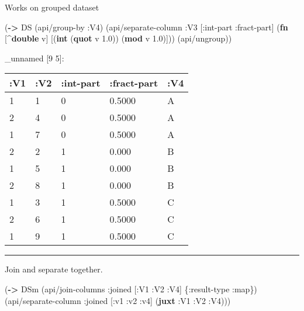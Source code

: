 \documentclass[]{article}
\newenvironment{Shaded}{\begin{snugshade}}{\end{snugshade}}
\newcommand{\KeywordTok}[1]{\textcolor[rgb]{0.13,0.29,0.53}{\textbf{#1}}}
\newcommand{\FloatTok}[1]{\textcolor[rgb]{0.00,0.00,0.81}{#1}}
\newcommand{\AttributeTok}[1]{\textcolor[rgb]{0.77,0.63,0.00}{#1}}
\newcommand{\NormalTok}[1]{#1}
\begin{document}
Works on grouped dataset

\begin{Shaded}
\begin{Highlighting}[]
\NormalTok{(}\KeywordTok{->}\NormalTok{ DS}
\NormalTok{    (api/group-by }\AttributeTok{:V4}\NormalTok{)}
\NormalTok{    (api/separate-column }\AttributeTok{:V3}\NormalTok{ [}\AttributeTok{:int-part} \AttributeTok{:fract-part}\NormalTok{] (}\KeywordTok{fn}\NormalTok{ [^}\KeywordTok{double}\NormalTok{ v]}
\NormalTok{                                                       [(}\KeywordTok{int}\NormalTok{ (}\KeywordTok{quot}\NormalTok{ v }\FloatTok{1.0}\NormalTok{))}
\NormalTok{                                                        (}\KeywordTok{mod}\NormalTok{ v }\FloatTok{1.0}\NormalTok{)]))}
\NormalTok{    (api/ungroup))}
\end{Highlighting}
\end{Shaded}

\_unnamed {[}9 5{]}:

\begin{longtable}[]{@{}lllll@{}}
\toprule
:V1 & :V2 & :int-part & :fract-part & :V4\tabularnewline
\midrule
\endhead
1 & 1 & 0 & 0.5000 & A\tabularnewline
2 & 4 & 0 & 0.5000 & A\tabularnewline
1 & 7 & 0 & 0.5000 & A\tabularnewline
2 & 2 & 1 & 0.000 & B\tabularnewline
1 & 5 & 1 & 0.000 & B\tabularnewline
2 & 8 & 1 & 0.000 & B\tabularnewline
1 & 3 & 1 & 0.5000 & C\tabularnewline
2 & 6 & 1 & 0.5000 & C\tabularnewline
1 & 9 & 1 & 0.5000 & C\tabularnewline
\bottomrule
\end{longtable}

\begin{center}\rule{0.5\linewidth}{0.5pt}\end{center}

Join and separate together.

\begin{Shaded}
\begin{Highlighting}[]
\NormalTok{(}\KeywordTok{->}\NormalTok{ DSm}
\NormalTok{    (api/join-columns }\AttributeTok{:joined}\NormalTok{ [}\AttributeTok{:V1} \AttributeTok{:V2} \AttributeTok{:V4}\NormalTok{] \{}\AttributeTok{:result-type} \AttributeTok{:map}\NormalTok{\})}
\NormalTok{    (api/separate-column }\AttributeTok{:joined}\NormalTok{ [}\AttributeTok{:v1} \AttributeTok{:v2} \AttributeTok{:v4}\NormalTok{] (}\KeywordTok{juxt} \AttributeTok{:V1} \AttributeTok{:V2} \AttributeTok{:V4}\NormalTok{)))}
\end{Highlighting}
\end{Shaded}
\end{document}
